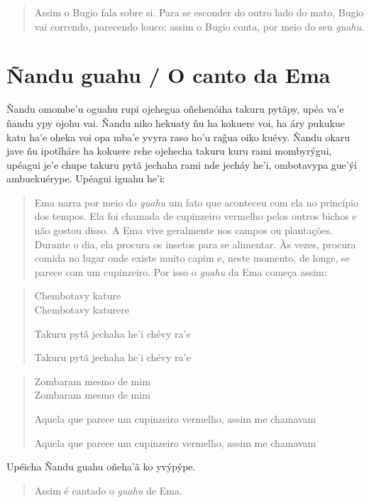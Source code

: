 \begin{itemize}
\begin{quote}
Assim o Bugio fala sobre si. Para se esconder do outro lado do mato,
Bugio vai correndo, parecendo louco; assim o Bugio conta, por meio do
seu \emph{guahu}.
\end{quote}

\chapter{Ñandu guahu / O canto da Ema}

Ñandu omombe'u oguahu rupi ojehegua oñehenóiha takuru pytãpy, upéa va'e
ñandu ypy ojohu vai. Ñandu niko hekuaty ñu ha kokuere voi, ha áry
pukukue katu ha'e oheka voi opa mba'e yvyra raso ho'u rag̃ua oiko kuévy.
Ñandu okaru jave ñu ipotĩháre ha kokuere rehe ojehecha takuru kuru rami
mombyrýgui, upéagui je'e chupe takuru pytã jechaha rami nde jecháy he'i,
ombotavypa gue'ýi ambuekuérype. Upéagui iguahu he'i:

\begin{quote}
Ema narra por meio do \emph{guahu} um fato que aconteceu com ela no
princípio dos tempos. Ela foi chamada de cupinzeiro vermelho pelos
outros bichos e não gostou disso. A Ema vive geralmente nos campos ou
plantações. Durante o dia, ela procura os insetos para se alimentar. Às
vezes, procura comida no lugar onde existe muito capim e, neste momento,
de longe, se parece com um cupinzeiro. Por isso o \emph{guahu} da Ema
começa assim:
\end{quote}

\begin{verse}
Chembotavy kature\\
Chembotavy katurere

Takuru pytã jechaha he'i chévy ra'e

Takuru pytã jechaha he'i chévy ra'e
\end{verse}

\begin{verse}
Zombaram mesmo de mim\\
Zombaram mesmo de mim

Aquela que parece um cupinzeiro vermelho, assim me chamavam

Aquela que parece um cupinzeiro vermelho, assim me chamavam
\end{verse}

Upéicha Ñandu guahu oñeha'ã ko yvýpýpe.

\begin{quote}
Assim é cantado o \emph{guahu} de Ema.
\end{quote}


\end{itemize}
